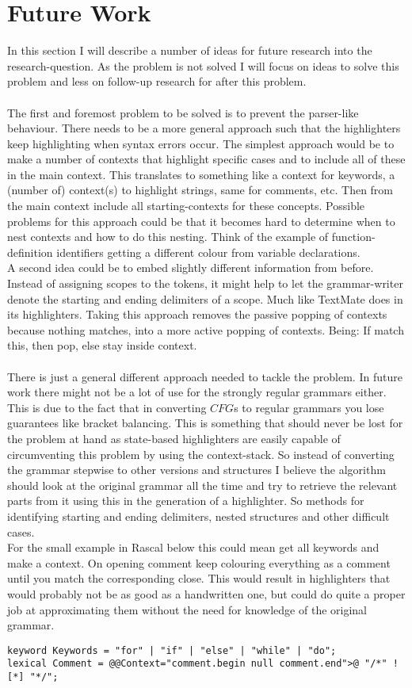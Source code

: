 \section{Future Work}
In this section I will describe a number of ideas for future research into the research-question. As the problem is not solved I will focus on ideas to solve this problem and less on follow-up research for after this problem.\\\\
The first and foremost problem to be solved is to prevent the parser-like behaviour. There needs to be a more general approach such that the highlighters keep highlighting when syntax errors occur. The simplest approach would be to make a number of contexts that highlight specific cases and to include all of these in the main context. This translates to something like a context for keywords, a (number of) context(s) to highlight strings, same for comments, etc. Then from the main context include all starting-contexts for these concepts. Possible problems for this approach could be that it becomes hard to determine when to nest contexts and how to do this nesting. Think of the example of function-definition identifiers getting a different colour from variable declarations.\\
A second idea could be to embed slightly different information from before. Instead of assigning scopes to the tokens, it might help to let the grammar-writer denote the starting and ending delimiters of a scope. Much like TextMate does in its highlighters. Taking this approach removes the passive popping of contexts because nothing matches, into a more active popping of contexts. Being: If match this, then pop, else stay inside context.\\\\
There is just a general different approach needed to tackle the problem. In future work there might not be a lot of use for the strongly regular grammars either. This is due to the fact that in converting $CFG$s to regular grammars you lose guarantees like bracket balancing. This is something that should never be lost for the problem at hand as state-based highlighters are easily capable of circumventing this problem by using the context-stack. So instead of converting the grammar stepwise to other versions and structures I believe the algorithm should look at the original grammar all the time and try to retrieve the relevant parts from it using this in the generation of a highlighter. So methods for identifying starting and ending delimiters, nested structures and other difficult cases.\\
For the small example in Rascal below this could mean get all keywords and make a context. On opening comment keep colouring everything as a comment until you match the corresponding close. This would result in highlighters that would probably not be as good as a handwritten one, but could do quite a proper job at approximating them without the need for knowledge of the original grammar. 
\begin{lstlisting}[language=RascalGrammar]
keyword Keywords = "for" | "if" | "else" | "while" | "do";
lexical Comment = @@Context="comment.begin null comment.end">@ "/*" ![*] "*/";

\end{lstlisting}